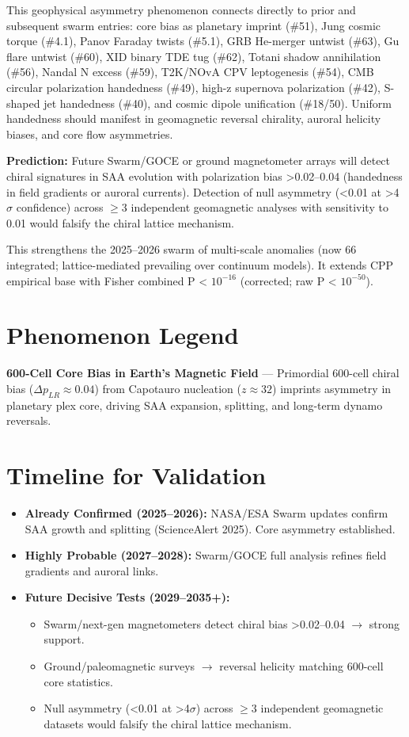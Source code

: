 \documentclass[11pt]{article}
\begin{document}
This geophysical asymmetry phenomenon connects directly to prior and subsequent swarm entries: core bias as planetary imprint (\#51), Jung cosmic torque (\#4.1), Panov Faraday twists (\#5.1), GRB He-merger untwist (\#63), Gu flare untwist (\#60), XID binary TDE tug (\#62), Totani shadow annihilation (\#56), Nandal N excess (\#59), T2K/NOvA CPV leptogenesis (\#54), CMB circular polarization handedness (\#49), high-z supernova polarization (\#42), S-shaped jet handedness (\#40), and cosmic dipole unification (\#18/50). Uniform handedness should manifest in geomagnetic reversal chirality, auroral helicity biases, and core flow asymmetries.

\textbf{Prediction:} Future Swarm/GOCE or ground magnetometer arrays will detect chiral signatures in SAA evolution with polarization bias >0.02--0.04 (handedness in field gradients or auroral currents). Detection of null asymmetry (<0.01 at >4$\sigma$ confidence) across $\geq 3$ independent geomagnetic analyses with sensitivity to 0.01 would falsify the chiral lattice mechanism.

This strengthens the 2025--2026 swarm of multi-scale anomalies (now 66 integrated; lattice-mediated prevailing over continuum models). It extends CPP empirical base with Fisher combined P < $10^{-16}$ (corrected; raw P < $10^{-50}$).

\section{Phenomenon Legend}
\textbf{600-Cell Core Bias in Earth's Magnetic Field} — Primordial 600-cell chiral bias ($\Delta p_{LR} \approx 0.04$) from Capotauro nucleation ($z \approx 32$) imprints asymmetry in planetary plex core, driving SAA expansion, splitting, and long-term dynamo reversals.

\section{Timeline for Validation}
\begin{itemize}
    \item \textbf{Already Confirmed (2025--2026):} NASA/ESA Swarm updates confirm SAA growth and splitting (ScienceAlert 2025). Core asymmetry established.
    \item \textbf{Highly Probable (2027--2028):} Swarm/GOCE full analysis refines field gradients and auroral links.
    \item \textbf{Future Decisive Tests (2029--2035+):}
    \begin{itemize}
        \item Swarm/next-gen magnetometers detect chiral bias >0.02--0.04 $\to$ strong support.
        \item Ground/paleomagnetic surveys $\to$ reversal helicity matching 600-cell core statistics.
        \item Null asymmetry (<0.01 at >4$\sigma$) across $\geq 3$ independent geomagnetic datasets would falsify the chiral lattice mechanism.
    \end{itemize}
\end{itemize}
\end{document}
